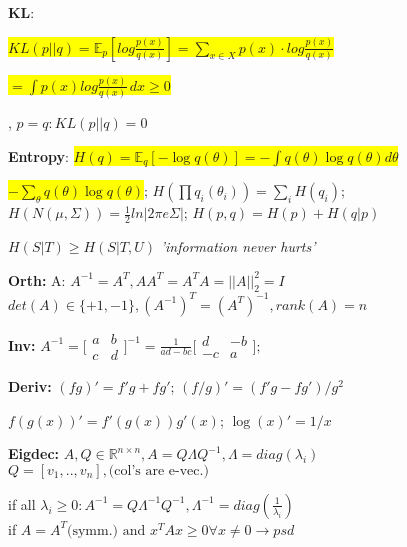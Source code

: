 \documentclass[11pt,landscape,a4paper,fleqn]{article}
\newcommand{\mhl}[1]{\setlength{\fboxsep}{0pt}\colorbox{yellow}{#1}}
\begin{document}
\begin{multicols*}{4}

\textbf{KL}: {\fontsize{10.5}{6}\selectfont \mhl{$KL(p||q) = \mathbb{E}_p[log\frac{p(x)}{q(x)}] = \sum_{x \in X} p(x) \cdot log \frac{p(x)}{q(x)}$}
	
\mhl{$= \int p(x) log \frac{p(x)}{q(x)} \, dx \geq 0$}}, $p=q: KL(p||q) = 0$


\textbf{Entropy}: \mhl{{\fontsize{9.5}{6}\selectfont $H(q) = \mathbb{E}_q[-\log q(\theta)] = - \int q(\theta)\log q(\theta) d\theta $}}

\mhl{{\fontsize{9.3}{6}\selectfont $- \sum_\theta q(\theta) \log q(\theta)$}};
$H(\prod q_i(\theta_i)) = \sum_i H(q_i)$; $H(N(\mu, \Sigma)) = \frac{1}{2}  ln|2\pi e \Sigma|$;
$H(p,q) = H(p) + H(q | p)$

$H(S | T) \geq H(S | T, U)$ \textit{'information never hurts'}

\textbf{Orth:} A: $A^{-1}=A^T,AA^T=A^TA=||A||_2^2=I$\\
$det(A)\in\{+1,-1\}, (A^{-1})^T=(A^T)^{-1}, rank(A)=n$

\textbf{Inv:} $A^{-1}=
\big[
\begin{smallmatrix}
a&b \\ 
c&d
\end{smallmatrix}\big]^{-1}=
\frac{1}{ad-bc}
\big[
\begin{smallmatrix}
d&-b \\ 
-c&a
\end{smallmatrix}\big];
$

\textbf{Deriv:}
$(fg)' = f'g + fg'$; $(f/g)' = (f'g - fg')/g^2$

$f(g(x))' = f'(g(x))g'(x)$; $\log(x)' = 1/x$

\iffalse
\textbf{Eigdec:}
$A,Q \in \mathbb{R}^{n\times n}, A=Q\Lambda Q^{-1},\! \Lambda = diag(\lambda_i)$\\
$Q=[v_1,..,v_n], \text{(col's are e-vec.)}$

if all $\lambda_i\geq0: A^{-1}=Q\Lambda^{-1}Q^{-1},\Lambda^{-1}=diag(\frac{1}{\lambda_i})$\\
if $A=A^T\text{(symm.) and }x^TAx\geq0 \forall x \neq 0 \rightarrow psd$


\end{multicols*}
\end{document}
